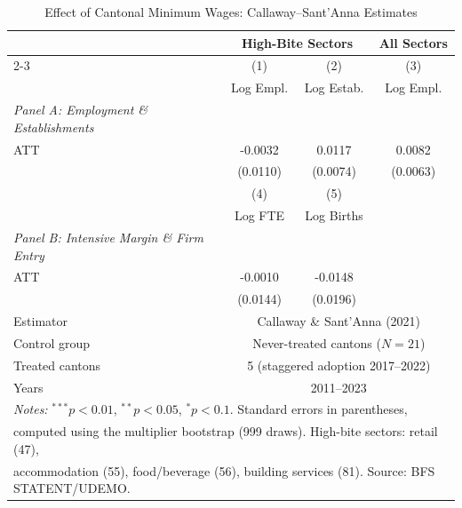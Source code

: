 \begin{table}[htbp]
\centering
\caption{Effect of Cantonal Minimum Wages: Callaway--Sant'Anna Estimates}
\label{tab:main}
\begin{tabular}{lccc}
\hline\hline
 & \multicolumn{2}{c}{High-Bite Sectors} & All Sectors \\
\cline{2-3}
 & (1) & (2) & (3) \\
 & Log Empl. & Log Estab. & Log Empl. \\
\hline
\textit{Panel A: Employment \& Establishments} & & & \\
ATT & -0.0032 & 0.0117 & 0.0082 \\
 & (0.0110) & (0.0074) & (0.0063) \\
 & (4) & (5) & \\
 & Log FTE & Log Births & \\
\hline
\textit{Panel B: Intensive Margin \& Firm Entry} & & & \\
ATT & -0.0010 & -0.0148 & \\
 & (0.0144) & (0.0196) & \\
\hline
Estimator & \multicolumn{3}{c}{Callaway \& Sant'Anna (2021)} \\
Control group & \multicolumn{3}{c}{Never-treated cantons ($N=21$)} \\
Treated cantons & \multicolumn{3}{c}{5 (staggered adoption 2017--2022)} \\
Years & \multicolumn{3}{c}{2011--2023} \\
\hline\hline
\multicolumn{4}{l}{\footnotesize \textit{Notes:} $^{***}p<0.01$, $^{**}p<0.05$, $^{*}p<0.1$. Standard errors in parentheses,} \\
\multicolumn{4}{l}{\footnotesize computed using the multiplier bootstrap (999 draws). High-bite sectors: retail (47),} \\
\multicolumn{4}{l}{\footnotesize accommodation (55), food/beverage (56), building services (81). Source: BFS STATENT/UDEMO.} \\
\end{tabular}
\end{table}


